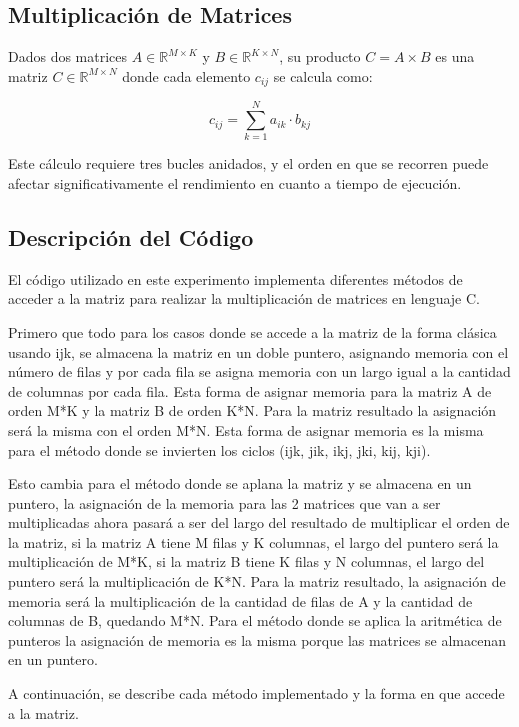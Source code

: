 \documentclass[10pt]{article}
\begin{document}
\subsection{Multiplicación de Matrices}
Dados dos matrices $A \in \mathbb{R}^{M \times K}$ y $B \in \mathbb{R}^{K \times N}$, su producto $C = A \times B$ es una matriz $C \in \mathbb{R}^{M \times N}$ donde cada elemento $c_{ij}$ se calcula como:

\[
c_{ij} = \sum_{k=1}^{N} a_{ik} \cdot b_{kj}
\]

Este cálculo requiere tres bucles anidados, y el orden en que se recorren puede afectar significativamente el rendimiento en cuanto a tiempo de ejecución.

\subsection{Descripción del Código}

El código utilizado en este experimento implementa diferentes métodos de acceder a la matriz para realizar la multiplicación de matrices en lenguaje C.

Primero que todo para los casos donde se accede a la matriz de la forma clásica usando ijk, se almacena la matriz en un doble puntero, asignando memoria con el número de filas y por cada fila se asigna memoria con un largo igual a la cantidad de columnas por cada fila. Esta forma de asignar memoria para la matriz A de orden M*K y la matriz B de orden K*N. Para la matriz resultado la asignación será la misma con el orden M*N. Esta forma de asignar memoria es la misma para el método donde se invierten los ciclos (ijk, jik, ikj, jki, kij, kji).

Esto cambia para el método donde se aplana la matriz y se almacena en un puntero, la asignación de la memoria para las 2 matrices que van a ser multiplicadas ahora pasará a ser del largo del resultado de multiplicar el orden de la matriz, si la matriz A tiene M filas y K columnas, el largo del puntero será la multiplicación de M*K, si la matriz B tiene K filas y N columnas, el largo del puntero será la multiplicación de K*N. Para la matriz resultado, la asignación de memoria será la multiplicación de la cantidad de filas de A y la cantidad de columnas de B, quedando M*N. Para el método donde se aplica la aritmética de punteros la asignación de memoria es la misma porque las matrices se almacenan en un puntero.

A continuación, se describe cada método implementado y la forma en que accede a la matriz.
\end{document}

